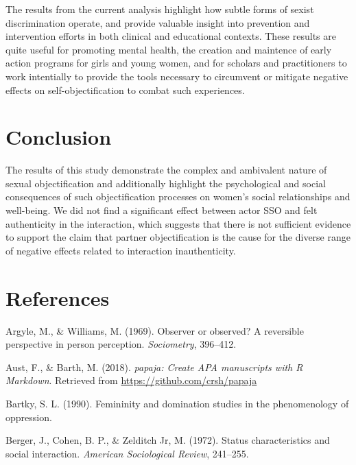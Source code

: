 \documentclass[man]{apa6}
\begin{document}
The results from the current analysis highlight how subtle forms of
sexist discrimination operate, and provide valuable insight into
prevention and intervention efforts in both clinical and educational
contexts. These results are quite useful for promoting mental health,
the creation and maintence of early action programs for girls and young
women, and for scholars and practitioners to work intentially to provide
the tools necessary to circumvent or mitigate negative effects on
self-objectification to combat such experiences.

\section{Conclusion}\label{conclusion}

The results of this study demonstrate the complex and ambivalent nature
of sexual objectification and additionally highlight the psychological
and social consequences of such objectification processes on women's
social relationships and well-being. We did not find a significant
effect between actor SSO and felt authenticity in the interaction, which
suggests that there is not sufficient evidence to support the claim that
partner objectification is the cause for the diverse range of negative
effects related to interaction inauthenticity.

\section{References}\label{references}

\newpage

\begingroup
\setlength{\parindent}{-0.5in} \setlength{\leftskip}{0.5in}

\hypertarget{refs}{}
\hypertarget{ref-argyle1969}{}
Argyle, M., \& Williams, M. (1969). Observer or observed? A reversible
perspective in person perception. \emph{Sociometry}, 396--412.

\hypertarget{ref-R-papaja}{}
Aust, F., \& Barth, M. (2018). \emph{papaja: Create APA manuscripts with
R Markdown}. Retrieved from \url{https://github.com/crsh/papaja}

\hypertarget{ref-Bartky}{}
Bartky, S. L. (1990). Femininity and domination studies in the
phenomenology of oppression.

\hypertarget{ref-berger1972}{}
Berger, J., Cohen, B. P., \& Zelditch Jr, M. (1972). Status
characteristics and social interaction. \emph{American Sociological
Review}, 241--255.
\end{document}
